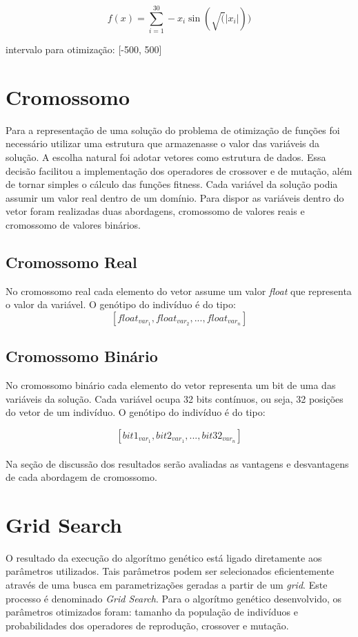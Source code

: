 \documentclass[conference]{IEEEtran}
\begin{document}
\[f(x) = \sum_{i=1}^{30} -x_i \sin(\sqrt(\left|x_i\right|))\]
\begin{center}intervalo para otimização: [-500, 500]\\\end{center}


\section{Cromossomo}
Para a representação de uma solução do problema de otimização de funções foi
necessário utilizar uma estrutura que armazenasse o valor das variáveis da 
solução. A escolha natural foi adotar vetores como estrutura de dados. Essa 
decisão facilitou a implementação dos operadores de crossover e de mutação, além
de tornar simples o cálculo das funções fitness.
Cada variável da solução podia assumir um valor real dentro de um domínio. Para
dispor as variáveis dentro do vetor foram realizadas duas abordagens, cromossomo
de valores reais e cromossomo de valores binários.\\

\subsection{Cromossomo Real}
No cromossomo real cada elemento do vetor assume um valor \textit{float} que
representa o valor da variável. O genótipo do indivíduo é do tipo:
\[[float_{var_1}, float_{var_2}, ..., float_{var_n}]\]

\subsection{Cromossomo Binário}
No cromossomo binário cada elemento do vetor representa um bit de uma das 
variáveis da solução. Cada variável ocupa 32 bits contínuos, ou seja, 32 
posições do vetor de um indivíduo. O genótipo do indivíduo é do tipo:

\[[bit1_{var_1}, bit2_{var_1}, ..., bit32_{var_n}]\]\\

Na seção de discussão dos resultados serão avaliadas as vantagens e desvantagens
de cada abordagem de cromossomo.

\section{Grid Search}
O resultado da execução do algorítmo genético está ligado diretamente aos
parâmetros utilizados. Tais parâmetros podem ser selecionados eficientemente
através de uma busca em parametrizações geradas a partir de um \textit{grid}.
Este processo é denominado \textit{Grid Search}.
Para o algorítmo genético desenvolvido, os parâmetros otimizados foram: tamanho 
da população de indivíduos e probabilidades dos operadores de reprodução, 
crossover e mutação.\\
\end{document}
